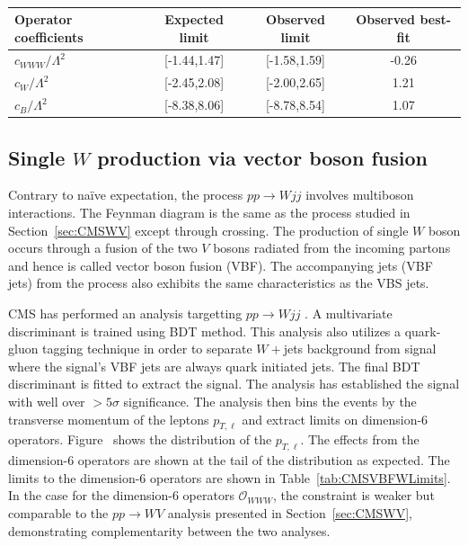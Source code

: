 \begin{table}[t]
\begin{center}
\caption{}
\label{tab:CMSWVLimits}
\begin{tabular}{l|ccc}
Operator coefficients & Expected limit & Observed limit & Observed best-fit \\ \hline
$c_{WWW} / \Lambda^2$ & [-1.44,1.47]   & [-1.58,1.59]   & -0.26  \\
$c_{W} / \Lambda^2$   & [-2.45,2.08]   & [-2.00,2.65]   & 1.21   \\
$c_{B} / \Lambda^2$   & [-8.38,8.06]   & [-8.78,8.54]   & 1.07   \\
\end{tabular}
\end{center}
\end{table}

\subsection{Single $W$ production via vector boson fusion}

Contrary to na\"ive expectation, the process $pp \to W jj$ involves multiboson interactions.
The Feynman diagram is the same as the process studied in Section~\ref{sec:CMSWV} except through crossing.
The production of single $W$ boson occurs through a fusion of the two $V$ bosons radiated from the incoming partons and hence is called vector boson fusion (VBF).
The accompanying jets (VBF jets) from the process also exhibits the same characteristics as the VBS jets.

CMS has performed an analysis targetting $pp \to W jj$ \cite{Sirunyan:2019dyi}.
A multivariate discriminant is trained using BDT method.
This analysis also utilizes a quark-gluon tagging technique in order to separate $W+$jets background from signal where the signal's VBF jets are always quark initiated jets.
The final BDT discriminant is fitted to extract the signal.
The analysis has established the signal with well over $>5\sigma$ significance.
The analysis then bins the events by the transverse momentum of the leptons $p_{T,\ell}$ and extract limits on dimension-6 operators.
Figure~ shows the distribution of the $p_{T,\ell}$.
The effects from the dimension-6 operators are shown at the tail of the distribution as expected.
The limits to the dimension-6 operators are shown in Table~\ref{tab:CMSVBFWLimits}.
In the case for the dimension-6 operators $\mathcal{O}_{WWW}$, the constraint is weaker but comparable to the $pp \to WV$ analysis presented in Section~\ref{sec:CMSWV}, demonstrating complementarity between the two analyses.

